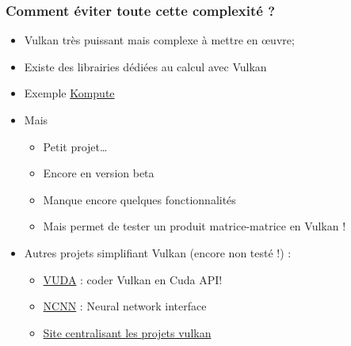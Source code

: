 \documentclass{beamer}
\begin{document}
\begin{frame}[fragile]
\frametitle{Comment éviter toute cette complexité ?}

\begin{itemize}
\item Vulkan très puissant mais complexe à mettre en {\oe}uvre;
\item Existe des librairies dédiées au calcul avec Vulkan
\item Exemple \href{https://github.com/KomputeProject/kompute}{Kompute}
\item \alert{Mais}
\begin{itemize}
\item Petit projet\dots
\item Encore en version beta
\item Manque encore quelques fonctionnalités
\item Mais permet de tester un produit matrice-matrice en Vulkan !
\end{itemize}
\item Autres projets simplifiant Vulkan (encore non testé !) : 
\begin{itemize}
\item \href{https://github.com/jgbit/vuda}{VUDA} : coder Vulkan en Cuda API!
\item \href{https://github.com/Tencent/ncnn}{NCNN} : Neural network interface
\item \href{https://github.com/vinjn/awesome-vulkan}{Site centralisant les projets vulkan}
\end{itemize}
\end{itemize}
\end{frame}
\end{document}
